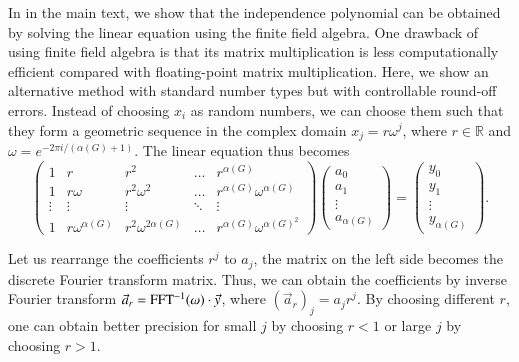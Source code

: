 \documentclass[review,supplement,onefignum,onetabnum]{siamart190516}
\begin{document}
In  in the main text, we show that the independence polynomial can be obtained by solving the linear equation  using the finite field algebra.
One drawback of using finite field algebra is that its matrix multiplication is less computationally efficient compared with floating-point matrix multiplication.
Here, we show an alternative method with standard number types but with controllable round-off errors.
Instead of choosing $x_{i}$ as random numbers, we can choose them such that they form a geometric sequence in the complex domain $x_j = r\omega^j$, where $r \in \mathbb{R}$ and $\omega = e^{-2\pi i/( \alpha(G)+1)}$. The linear equation thus becomes
\begin{equation}
\left(\begin{matrix}
1 & r & r^2 & \ldots & r^{\alpha(G)} \\
1 & r\omega & r^2\omega^2 & \ldots & r^{\alpha(G)} \omega^{\alpha(G)} \\
\vdots & \vdots & \vdots &\ddots & \vdots \\
1 & r\omega^{\alpha(G)} & r^2\omega^{2{\alpha(G)}} & \ldots & r^{\alpha(G)}\omega^{{\alpha(G)}^2}
\end{matrix}\right)
\left(\begin{matrix}
a_0 \\ a_1 \\ \vdots \\ a_{\alpha(G)}
\end{matrix}\right)
= \left(\begin{matrix}
y_0 \\ y_1 \\ \vdots \\ y_{\alpha(G)}
\end{matrix}\right).
\end{equation}

Let us rearrange the coefficients $r^j$ to $a_j$, the matrix on the left side becomes the discrete Fourier transform matrix. Thus, we can obtain the coefficients by inverse Fourier transform $\vec a_r = {\rm FFT^{-1}}(\omega) \cdot \vec y$, where $(\vec a_r)_j = a_j r ^j$.
By choosing different $r$, one can obtain better precision for small $j$ by choosing $r<1$ or large $j$ by choosing $r>1$.
\end{document}

